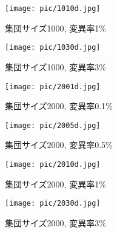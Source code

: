 \documentclass[a4j]{jarticle}
\begin{document}
\begin{figure}[htb]
 \begin{minipage}{0.5\hsize}
  \begin{center}
  \texttt{[image: pic/1010d.jpg]}
  \end{center}
  \caption{集団サイズ1000, 変異率1\%}
  \label{1010d}
 \end{minipage}
 \begin{minipage}{0.5\hsize}
  \begin{center}
  \texttt{[image: pic/1030d.jpg]}
  \end{center}
  \caption{集団サイズ1000, 変異率3\%}
  \label{1030d}
 \end{minipage}
\end{figure}

\begin{figure}[htb]
 \begin{minipage}{0.5\hsize}
  \begin{center}
  \texttt{[image: pic/2001d.jpg]}
  \end{center}
  \caption{集団サイズ2000, 変異率0.1\%}
  \label{2001d}
 \end{minipage}
 \begin{minipage}{0.5\hsize}
  \begin{center}
  \texttt{[image: pic/2005d.jpg]}
  \end{center}
  \caption{集団サイズ2000, 変異率0.5\%}
  \label{2005d}
 \end{minipage}
\end{figure}
\begin{figure}[htb]
 \begin{minipage}{0.5\hsize}
  \begin{center}
  \texttt{[image: pic/2010d.jpg]}
  \end{center}
  \caption{集団サイズ2000, 変異率1\%}
  \label{2010d}
 \end{minipage}
 \begin{minipage}{0.5\hsize}
  \begin{center}
  \texttt{[image: pic/2030d.jpg]}
  \end{center}
  \caption{集団サイズ2000, 変異率3\%}
  \label{2030d}
 \end{minipage}
\end{figure}

\clearpage
\end{document}
